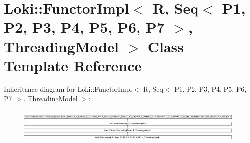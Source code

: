 \hypertarget{classLoki_1_1FunctorImpl_3_01R_00_01Seq_3_01P1_00_01P2_00_01P3_00_01P4_00_01P5_00_01P6_00_01P7_01_4_00_01ThreadingModel_01_4}{}\section{Loki\+:\+:Functor\+Impl$<$ R, Seq$<$ P1, P2, P3, P4, P5, P6, P7 $>$, Threading\+Model $>$ Class Template Reference}
\label{classLoki_1_1FunctorImpl_3_01R_00_01Seq_3_01P1_00_01P2_00_01P3_00_01P4_00_01P5_00_01P6_00_01P7_01_4_00_01ThreadingModel_01_4}
Inheritance diagram for Loki\+:\+:Functor\+Impl$<$ R, Seq$<$ P1, P2, P3, P4, P5, P6, P7 $>$, Threading\+Model $>$\+:\begin{figure}[H]
\begin{center}
\leavevmode
\includegraphics[height=1.751368cm]{classLoki_1_1FunctorImpl_3_01R_00_01Seq_3_01P1_00_01P2_00_01P3_00_01P4_00_01P5_00_01P6_00_01P7_01_4_00_01ThreadingModel_01_4}
\end{center}
\end{figure}
